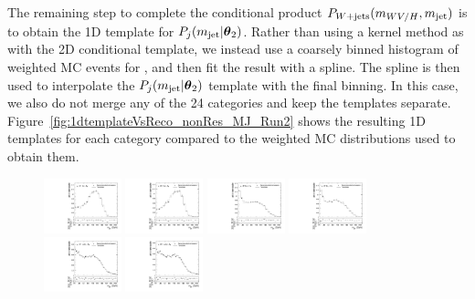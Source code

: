 The remaining step to complete the conditional product $P_{W+\text{jets}}(m_{WV/H},m_\mathrm{jet})$ is to obtain the 1D template for $P_j(m_\mathrm{jet}|\vb*{\theta}_2)$.
Rather than using a kernel method as with the 2D conditional template, we instead use a coarsely binned histogram of weighted MC events for \MJ, and then fit the result with a spline.
The spline is then used to interpolate the $P_j(m_\mathrm{jet}|\vb*{\theta}_2)$ template with the final \MJ binning.
In this case, we also do not merge any of the 24 categories and keep the templates separate.
Figure~\ref{fig:1dtemplateVsReco_nonRes_MJ_Run2} shows the resulting 1D templates for each category compared to the weighted MC distributions used to obtain them.

\begin{figure}[htbp]
  \centering
  \includegraphics[width=0.2\textwidth]{fig/2Dfit/templateVsReco_nonRes_r0_MJ_mu_HP_bb_LDy.pdf}
  \includegraphics[width=0.2\textwidth]{fig/2Dfit/templateVsReco_nonRes_r0_MJ_e_HP_bb_LDy.pdf}
  \includegraphics[width=0.2\textwidth]{fig/2Dfit/templateVsReco_nonRes_r0_MJ_mu_LP_bb_LDy.pdf}
  \includegraphics[width=0.2\textwidth]{fig/2Dfit/templateVsReco_nonRes_r0_MJ_e_LP_bb_LDy.pdf}\\
  \includegraphics[width=0.2\textwidth]{fig/2Dfit/templateVsReco_nonRes_r0_MJ_mu_HP_nobb_LDy.pdf}
  \includegraphics[width=0.2\textwidth]{fig/2Dfit/templateVsReco_nonRes_r0_MJ_e_HP_nobb_LDy.pdf}

\end{figure}
